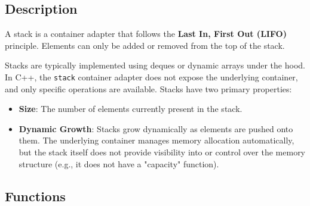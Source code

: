 \documentclass{article}
\begin{document}
\subsection{Description}

A stack is a container adapter that follows the \textbf{Last In, First Out (LIFO)} principle. Elements can only be added or removed from the top of the stack.

\noindent Stacks are typically implemented using deques or dynamic arrays under the hood. In C++, the \texttt{stack} container adapter does not expose the underlying container, and only specific operations are available.
\noindent Stacks have two primary properties:
\begin{itemize}
    \item \textbf{Size}: The number of elements currently present in the stack.
    \item \textbf{Dynamic Growth}: Stacks grow dynamically as elements are pushed onto them. The underlying container manages memory allocation automatically, but the stack itself does not provide visibility into or control over the memory structure (e.g., it does not have a "capacity" function).
\end{itemize}

\subsection{Functions}
\end{document}
